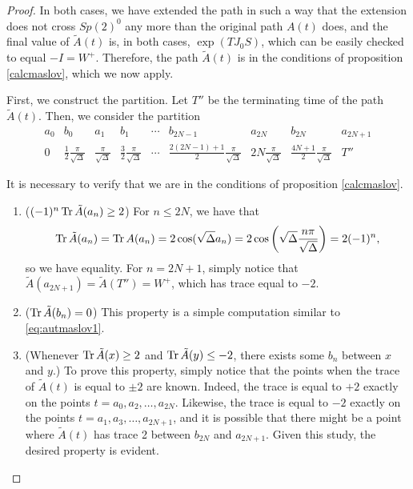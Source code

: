 \begin{proof}
In both cases, we have extended the path in such a way that the extension does not cross $Sp(2)^0$ any more than the original path $A(t)$ does, and the final value of $\tilde A(t)$ is, in both cases, $\exp(T J_0 S)$, which can be easily checked to equal $-I = W^+$. Therefore, the path $\tilde A(t)$ is in the conditions of proposition \ref{calcmaslov}, which we now apply.

First, we construct the partition. Let $T''$ be the terminating time of the path $\tilde A(t)$. Then, we consider the partition
\begin{equation}\label{autmaslov:thepartition}
\begin{array}{c|c|c|c|c|c|c|c|c}
a_0 & b_0 & a_1 & b_1
& \cdots &
b_{2N-1} & a_{2N} & b_{2N} & a_{2N+1} \\
\hline
0 & \frac12 \frac{\pi}{\sqrt\Delta} & \frac{\pi}{\sqrt\Delta} & \frac32 \frac{\pi}{\sqrt\Delta}
& \cdots &
\frac{2(2N-1)+1}2 \frac{\pi}{\sqrt\Delta} & 2N \frac{\pi}{\sqrt\Delta} & \frac{4N+1}2 \frac{\pi}{\sqrt\Delta} & T''
\end{array}
\end{equation}

It is necessary to verify that we are in the conditions of proposition \ref{calcmaslov}.
\begin{enumerate}
\item ($(-1)^n \operatorname{Tr} \tilde A(a_n) \geq 2$) For $n \leq 2N$, we have that
\begin{equation}\label{eq:autmaslov1}
\operatorname{Tr} \tilde A(a_n) = \operatorname{Tr} A(a_n) = 2 \cos(\sqrt\Delta a_n) = 2 \cos\left(\sqrt\Delta \frac{n \pi}{\sqrt\Delta}\right) = 2 (-1)^n,
\end{equation}
so we have equality. For $n = 2N+1$, simply notice that $\tilde A(a_{2N+1}) = \tilde A(T'') = W^+$, which has trace equal to $-2$.

\item ($\operatorname{Tr} \tilde A(b_n) = 0$) This property is a simple computation similar to \eqref{eq:autmaslov1}.

\item (Whenever $\operatorname{Tr} \tilde A(x) \geq 2$ and $\operatorname{Tr} \tilde A(y) \leq -2$, there exists some $b_n$ between $x$ and $y$.) To prove this property, simply notice that the points when the trace of $\tilde A(t)$ is equal to $\pm 2$ are known. Indeed, the trace is equal to $+2$ exactly on the points $t = a_0, a_2, \dots, a_{2N}$. Likewise, the trace is equal to $-2$ exactly on the points $t = a_1, a_3, \dots, a_{2N+1}$, and it is possible that there might be a point where $\tilde A(t)$ has trace 2 between $b_{2N}$ and $a_{2N+1}$. Given this study, the desired property is evident.
\end{enumerate}


\end{proof}
